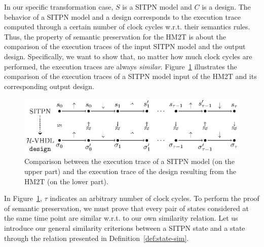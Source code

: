 In our specific transformation case, $S$ is a SITPN model and $C$ is a
\hvhdl{} design. The behavior of a SITPN model and a \hvhdl{} design
corresponds to the execution trace computed through a certain number
of clock cycles w.r.t. their semantics rules. Thus, the property of
semantic preservation for the HM2T is about the comparison of the
execution traces of the input SITPN model and the output \hvhdl{}
design. Specifically, we want to show that, no matter how much clock
cycles are performed, the execution traces are always
\textit{similar}. Figure~\ref{fig:trace-comparison} illustrates the
comparison of the execution traces of a SITPN model input of the HM2T
and its corresponding output design.
\begin{figure}[!ht]
  \centering
  \includegraphics[keepaspectratio,width=\textwidth]{trace-comparison-full.eps}
  \caption{Comparison between the execution trace of a SITPN model (on
    the upper part) and the execution trace of the \hvhdl{} design
    resulting from the HM2T (on the lower part).}
  \label{fig:trace-comparison}
\end{figure}

In Figure~\ref{fig:trace-comparison}, $\tau$ indicates an arbitrary
number of clock cycles. To perform the proof of semantic preservation,
we must prove that every pair of states considered at the same time
point are similar w.r.t. to our own similarity relation.  Let us
introduce our general similarity criterions between a SITPN state and
a \hvhdl{} state through the relation presented in
Definition~\ref{def:state-sim}.

